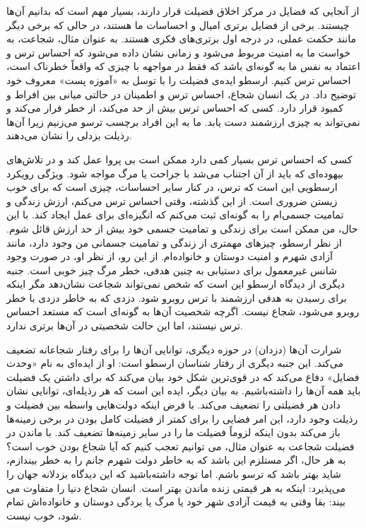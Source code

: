 از آنجایی که فضایل در مرکز اخلاق فضیلت قرار دارند، بسیار مهم است که بدانیم آن‌ها چیستند.
برخی از فضایل برتری امیال و احساسات ما هستند، در حالی که برخی دیگر مانند حکمت عملی، در درجه اول برتری‌های فکری هستند.
به عنوان مثال، شجاعت، به خواست ما به امنیت مربوط می‌شود و زمانی نشان داده می‌شود که احساس ترس و اعتماد به نفس ما به گونه‌ای باشد که فقط در مواجهه با چیزی که واقعاً خطرناک است، احساس ترس کنیم.
ارسطو ایده‌ی فضیلت را با توسل به «آموزه پست» معروف خود توضیح داد.
در یک انسان شجاع، احساس ترس و اطمینان در حالتی میانی بین افراط و کمبود قرار دارد.
کسی که احساس ترس بیش از حد می‌کند، از خطر فرار می‌کند و نمی‌تواند به چیزی ارزشمند دست یابد.
ما به این افراد برچسب ترسو می‌زنیم زیرا آن‌ها رذیلت بزدلی را نشان می‌دهند.

کسی که احساس ترس بسیار کمی دارد ممکن است بی پروا عمل کند و در تلاش‌های بیهوده‌ای که باید از آن اجتناب می‌شد با جراحت یا مرگ مواجه شود.
ویژگی رویکرد ارسطویی این است که ترس، در کنار سایر احساسات، چیزی است که برای خوب زیستن ضروری است.
از این گذشته، وقتی احساس ترس می‌کنم، ارزش زندگی و تمامیت جسمی‌ام را به گونه‌ای ثبت می‌کنم که انگیزه‌ای برای عمل ایجاد کند.
با این حال، من ممکن است برای زندگی و تمامیت جسمی خود بیش از حد ارزش قائل شوم.
از نظر ارسطو، چیزهای مهمتری از زندگی و تمامیت جسمانی من وجود دارد، مانند آزادی شهرم و امنیت دوستان و خانواده‌ام.
از این رو، از نظر او، در صورت وجود شانس غیرمعمول برای دستیابی به چنین هدفی، خطر مرگ چیز خوبی است.
جنبه دیگری از دیدگاه ارسطو این است که شخص نمی‌تواند شجاعت نشان‌دهد مگر اینکه برای رسیدن به هدفی ارزشمند با ترس روبرو شود.
دزدی که به خاطر دزدی با خطر روبرو می‌شود، شجاع نیست.
اگرچه شخصیت آن‌ها به گونه‌ای است که مستعد احساس ترس نیستند، اما این حالت شخصیتی در آن‌ها برتری ندارد.

شرارت آن‌ها (دزدان) در حوزه دیگری، توانایی آن‌ها را برای رفتار شجاعانه تضعیف می‌کند.
این جنبه دیگری از رفتار شناسان ارسطو است: او از ایده‌ای به نام «وحدت فضایل» دفاع می‌کند که در قوی‌ترین شکل خود بیان می‌کند که برای داشتن یک فضیلت باید همه آن‌ها را داشته‌باشیم.
به بیان دیگر، ایده این است که هر رذیله‌ای، توانایی نشان دادن هر فضیلتی را تضعیف می‌کند.
با فرض اینکه دولت‌هایی واسطه بین فضیلت و رذیلت وجود دارد، این امر فضایی را برای کمتر از فضیلت کامل بودن در برخی زمینه‌ها باز می‌کند بدون اینکه لزوماً فضیلت ما را در سایر زمینه‌ها تضعیف کند.
با ماندن در فضیلت شجاعت به عنوان مثال، می توانیم تعجب کنیم که آیا شجاع بودن خوب است؟ به هر حال، اگر مستلزم این باشد که به خاطر دولت شهرم جانم را به خطر بیندازم، شاید بهتر باشد که ترسو باشم.
اما توجه داشته‌باشید که این دیدگاه بزدلانه جهان را می‌پذیرد: اینکه به هر قیمتی زنده ماندن بهتر است.
انسان شجاع دنیا را متفاوت می بیند: بقا وقتی به قیمت آزادی شهر خود یا مرگ یا بردگی دوستان و خانواده‌اش تمام شود، خوب نیست.

